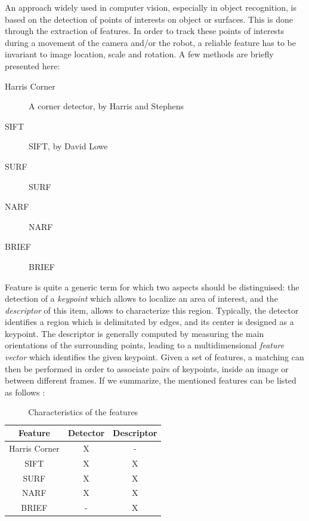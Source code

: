 An approach widely used in computer vision, especially in object recognition, is based on the detection of points of interests on object or surfaces. This is done through the extraction of features. In order to track these points of interests during a movement of the camera and/or the robot, a reliable feature has to be invariant to image location, scale and rotation. A few methods are briefly presented here:

\begin{description}
\item[Harris Corner] A corner detector, by Harris and Stephens~\cite{Harris88alvey}
\item[SIFT] \gls{SIFT}, by David Lowe~\cite{lowe_2004_sift} 
\item[SURF] \gls{SURF}~\cite{surf}
\item[NARF] \gls{NARF}~\cite{steder10irosws}
\item[BRIEF] \gls{BRIEF}~\cite{Calonder10-brief}
\end{description}

Feature is quite a generic term for which two aspects should be distinguised: the detection of a \emph{keypoint} which allows to localize an area of interest, and the \emph{descriptor} of this item, allows to characterize this region. Typically, the detector identifies a region which is delimitated by edges, and its center is designed as a keypoint. The descriptor is generally computed by measuring the main orientations of the surrounding points, leading to a multidimensional \emph{feature vector} which identifies the given keypoint. Given a set of features, a matching can then be performed in order to associate pairs of keypoints, inside an image or between different frames. If we summarize, the mentioned features can be listed as follows :

\begin {table}
 \begin{center}
  \begin{tabular}{c|cc}
  \hline
  Feature & Detector & Descriptor \\
  \hline
  Harris Corner & X & - \\
  SIFT & X & X \\
  SURF & X & X \\
  NARF & X & X \\
  BRIEF & - & X \\
  \hline
  \end{tabular}
 \end{center}
\caption {Characteristics of the features}
\end{table}

